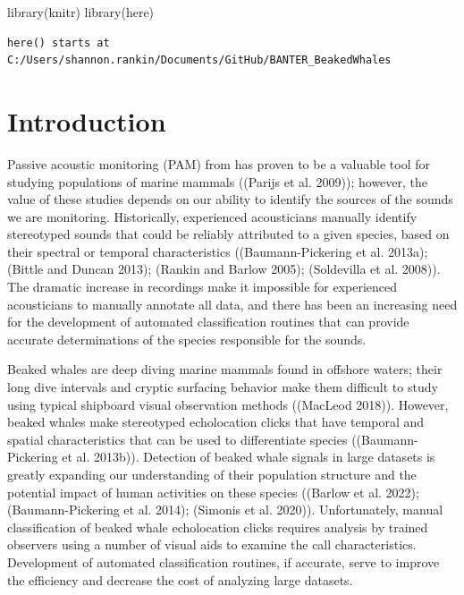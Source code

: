 \documentclass[
  letterpaper,
  DIV=11,
  numbers=noendperiod]{scrartcl}
\newenvironment{Shaded}{\begin{snugshade}}{\end{snugshade}}
\newcommand{\FunctionTok}[1]{\textcolor[rgb]{0.28,0.35,0.67}{#1}}
\newcommand{\NormalTok}[1]{\textcolor[rgb]{0.00,0.23,0.31}{#1}}
\begin{document}
\begin{Shaded}
\begin{Highlighting}[]
\FunctionTok{library}\NormalTok{(knitr)}
\FunctionTok{library}\NormalTok{(here)}
\end{Highlighting}
\end{Shaded}

\begin{verbatim}
here() starts at C:/Users/shannon.rankin/Documents/GitHub/BANTER_BeakedWhales
\end{verbatim}

\hypertarget{introduction}{%
\section{Introduction}\label{introduction}}

Passive acoustic monitoring (PAM) from has proven to be a valuable tool
for studying populations of marine mammals ((Parijs et al. 2009));
however, the value of these studies depends on our ability to identify
the sources of the sounds we are monitoring. Historically, experienced
acousticians manually identify stereotyped sounds that could be reliably
attributed to a given species, based on their spectral or temporal
characteristics ((Baumann-Pickering et al. 2013a); (Bittle and Duncan
2013); (Rankin and Barlow 2005); (Soldevilla et al. 2008)). The dramatic
increase in recordings make it impossible for experienced acousticians
to manually annotate all data, and there has been an increasing need for
the development of automated classification routines that can provide
accurate determinations of the species responsible for the sounds.

Beaked whales are deep diving marine mammals found in offshore waters;
their long dive intervals and cryptic surfacing behavior make them
difficult to study using typical shipboard visual observation methods
((MacLeod 2018)). However, beaked whales make stereotyped echolocation
clicks that have temporal and spatial characteristics that can be used
to differentiate species ((Baumann-Pickering et al. 2013b)). Detection
of beaked whale signals in large datasets is greatly expanding our
understanding of their population structure and the potential impact of
human activities on these species ((Barlow et al. 2022);
(Baumann-Pickering et al. 2014); (Simonis et al. 2020)). Unfortunately,
manual classification of beaked whale echolocation clicks requires
analysis by trained observers using a number of visual aids to examine
the call characteristics. Development of automated classification
routines, if accurate, serve to improve the efficiency and decrease the
cost of analyzing large datasets.
\end{document}
